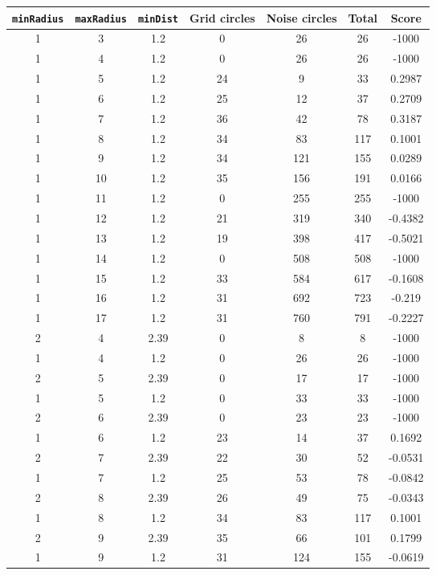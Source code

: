 \documentclass[letterpaper, 12pt]{article}
\begin{document}
\begin{longtable}{|c|c|c|c|c|c|c|}
\hline
\textbf{\texttt{minRadius}} & \textbf{\texttt{maxRadius}} & \textbf{\texttt{minDist}} & \textbf{Grid circles} & \textbf{Noise circles} & \textbf{Total} & \textbf{Score} \\
\hline
1 & 3 & 1.2 & 0 & 26 & 26 & -1000 \\
\hline
1 & 4 & 1.2 & 0 & 26 & 26 & -1000 \\
\hline
1 & 5 & 1.2 & 24 & 9 & 33 & 0.2987 \\
\hline
1 & 6 & 1.2 & 25 & 12 & 37 & 0.2709 \\
\hline
1 & 7 & 1.2 & 36 & 42 & 78 & 0.3187 \\
\hline
1 & 8 & 1.2 & 34 & 83 & 117 & 0.1001 \\
\hline
1 & 9 & 1.2 & 34 & 121 & 155 & 0.0289 \\
\hline
1 & 10 & 1.2 & 35 & 156 & 191 & 0.0166 \\
\hline
1 & 11 & 1.2 & 0 & 255 & 255 & -1000 \\
\hline
1 & 12 & 1.2 & 21 & 319 & 340 & -0.4382 \\
\hline
1 & 13 & 1.2 & 19 & 398 & 417 & -0.5021 \\
\hline
1 & 14 & 1.2 & 0 & 508 & 508 & -1000 \\
\hline
1 & 15 & 1.2 & 33 & 584 & 617 & -0.1608 \\
\hline
1 & 16 & 1.2 & 31 & 692 & 723 & -0.219 \\
\hline
1 & 17 & 1.2 & 31 & 760 & 791 & -0.2227 \\
\hline
2 & 4 & 2.39 & 0 & 8 & 8 & -1000 \\
\hline
1 & 4 & 1.2 & 0 & 26 & 26 & -1000 \\
\hline
2 & 5 & 2.39 & 0 & 17 & 17 & -1000 \\
\hline
1 & 5 & 1.2 & 0 & 33 & 33 & -1000 \\
\hline
2 & 6 & 2.39 & 0 & 23 & 23 & -1000 \\
\hline
1 & 6 & 1.2 & 23 & 14 & 37 & 0.1692 \\
\hline
2 & 7 & 2.39 & 22 & 30 & 52 & -0.0531 \\
\hline
1 & 7 & 1.2 & 25 & 53 & 78 & -0.0842 \\
\hline
2 & 8 & 2.39 & 26 & 49 & 75 & -0.0343 \\
\hline
1 & 8 & 1.2 & 34 & 83 & 117 & 0.1001 \\
\hline
2 & 9 & 2.39 & 35 & 66 & 101 & 0.1799 \\
\hline
1 & 9 & 1.2 & 31 & 124 & 155 & -0.0619 \\

\end{longtable}
\end{document}
